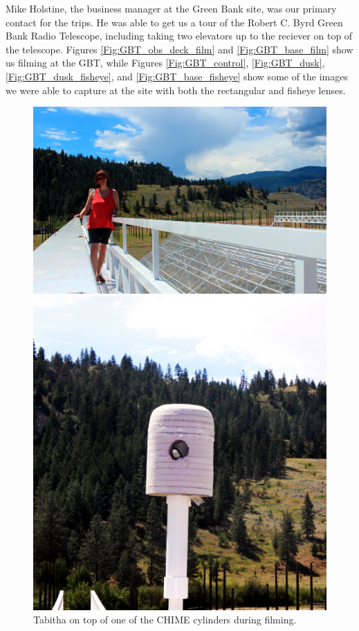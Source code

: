 Mike Holstine, the business manager at the Green Bank site, was our primary contact for the trips. He was able to get us a tour of the Robert C. Byrd Green Bank Radio Telescope, including taking two elevators up to the reciever on top of the telescope. Figures \ref{Fig:GBT_obs_deck_film} and \ref{Fig:GBT_base_film} show us filming at the GBT, while Figures \ref{Fig:GBT_control}, \ref{Fig:GBT_dusk}, \ref{Fig:GBT_dusk_fisheye}, and \ref{Fig:GBT_base_fisheye} show some of the images we were able to capture at the site with both the rectangular and fisheye lenses. 


\begin{figure}[htb]
\centering
\begin{minipage}[b]{0.57\textwidth}
\centering
\includegraphics[width=0.95\linewidth]{Planetarium/figures/Filming_at_CHIME.jpg}
\caption{Tabitha on top of one of the CHIME cylinders during filming. }
\label{Fig:CHIME_film}
\end{minipage}%
\begin{minipage}[b]{0.02\textwidth}
\hspace{1cm}
\end{minipage}%
\begin{minipage}[b]{0.37\textwidth}
\centering
\includegraphics[width=0.95\linewidth]{Planetarium/figures/CHIME_birdsnest.jpg}

\end{minipage}
\end{figure}
